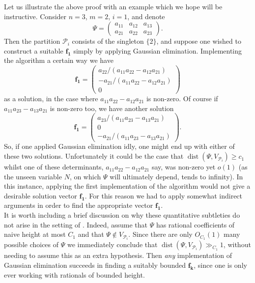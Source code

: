\documentclass[12pt,a4paper,twoside,reqno]{amsart}
\newcommand{\dist}{\operatorname{dist}}
\numberwithin{equation}{section}
\begin{document}
Let us illustrate the above proof with an example which we hope will be instructive. Consider $n=3$, $m=2$, $i=1$, and denote $$\Psi = \left(\begin{matrix}
a_{11} & a_{12} & a_{13}\\
a_{21} & a_{22} & a_{23}
\end{matrix}\right).$$ Then the partition $\mathcal{P}_i$ consists of the singleton $\{2\}$, and suppose one wished to construct a suitable $\mathbf{f_1}$ simply by applying Gaussian elimination. Implementing the algorithm a certain way we have $$\mathbf{f_1} = \left(\begin{matrix}
a_{22}/(a_{11}a_{22} - a_{12}a_{21})\\
-a_{21}/(a_{11}a_{22} - a_{12}a_{21})\\
 0
 \end{matrix}\right)
 $$ as a solution, in the case where $a_{11}a_{22} - a_{12}a_{21}$ is non-zero. Of course if $a_{11}a_{23}-a_{13}a_{21}$ is non-zero too, we have another solution 
 $$\mathbf{f_1} = \left(\begin{matrix}
 a_{23}/(a_{11}a_{23} - a_{13}a_{21})\\
   0\\
   -a_{21}/(a_{11}a_{23} - a_{13}a_{21})
  \end{matrix}\right).
  $$ So, if one applied Gaussian elimination idly, one might end up with either of these two solutions. Unfortunately it could be the case that $\operatorname{dist}(\Psi,V_{\mathcal{P}_i})\geqslant c_1$ whilst one of these determinants, $a_{11}a_{22} - a_{12}a_{21}$ say, was non-zero yet $o(1)$ (as the unseen variable $N$, on which $\Psi$ will ultimately depend, tends to infinity). In this instance, applying the first implementation of the algorithm would not give a desirable solution vector $\mathbf{f_1}$. For this reason we had to apply somewhat indirect arguments in order to find the appropriate vector $\mathbf{f_1}$.\\  
 

It is worth including a brief discussion on why these quantitative subtleties do not arise in the setting of \cite{GT10}. Indeed, assume that $\Psi$ has rational coefficients of naive height at most $C_1$ and that $\Psi \notin V_{\mathcal{P}_i}$. Since there are only $O_{C_1}(1)$ many possible choices of $\Psi$ we immediately conclude that $\dist(\Psi,V_{\mathcal{P}_i}) \gg_{C_1}1$, without needing to assume this as an extra hypothesis. Then \emph{any} implementation of Gaussian elimination succeeds in finding a suitably bounded $\mathbf{f_k}$, since one is only ever working with rationals of bounded height. 
\end{document}
